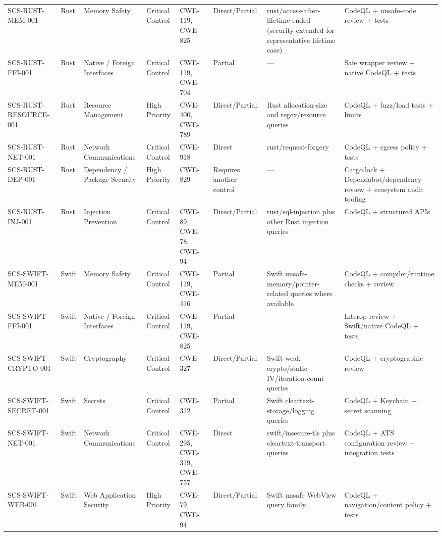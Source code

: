 \documentclass[10pt,letterpaper]{article}
\begin{document}
\begin{landscape}
\begin{longtable}{@{}P{1.0in}P{0.6in}P{0.95in}P{0.75in}P{0.85in}P{0.75in}P{2.0in}P{2.05in}@{}}
SCS-RUST-MEM-001 & Rust & Memory Safety & Critical Control & CWE-119, CWE-825 & Direct/Partial & rust/access-after-lifetime-ended (security-extended for representative lifetime case) & CodeQL + unsafe-code review + tests\\
SCS-RUST-FFI-001 & Rust & Native / Foreign Interfaces & Critical Control & CWE-119, CWE-704 & Partial & --- & Safe wrapper review + native CodeQL + tests\\
SCS-RUST-RESOURCE-001 & Rust & Resource Management & High Priority & CWE-400, CWE-789 & Direct/Partial & Rust allocation-size and regex/resource queries & CodeQL + fuzz/load tests + limits\\
SCS-RUST-NET-001 & Rust & Network Communications & Critical Control & CWE-918 & Direct & rust/request-forgery & CodeQL + egress policy + tests\\
SCS-RUST-DEP-001 & Rust & Dependency / Package Security & High Priority & CWE-829 & Requires another control & --- & Cargo.lock + Dependabot/dependency review + ecosystem audit tooling\\
SCS-RUST-INJ-001 & Rust & Injection Prevention & Critical Control & CWE-89, CWE-78, CWE-94 & Direct/Partial & rust/sql-injection plus other Rust injection queries & CodeQL + structured APIs\\
SCS-SWIFT-MEM-001 & Swift & Memory Safety & Critical Control & CWE-119, CWE-416 & Partial & Swift unsafe-memory/pointer-related queries where available & CodeQL + compiler/runtime checks + review\\
SCS-SWIFT-FFI-001 & Swift & Native / Foreign Interfaces & Critical Control & CWE-119, CWE-825 & Partial & --- & Interop review + Swift/native CodeQL + tests\\
SCS-SWIFT-CRYPTO-001 & Swift & Cryptography & Critical Control & CWE-327 & Direct/Partial & Swift weak-crypto/static-IV/iteration-count queries & CodeQL + cryptographic review\\
SCS-SWIFT-SECRET-001 & Swift & Secrets & Critical Control & CWE-312 & Partial & Swift cleartext-storage/logging queries & CodeQL + Keychain + secret scanning\\
SCS-SWIFT-NET-001 & Swift & Network Communications & Critical Control & CWE-295, CWE-319, CWE-757 & Direct & swift/insecure-tls plus cleartext-transport queries & CodeQL + ATS configuration review + integration tests\\
SCS-SWIFT-WEB-001 & Swift & Web Application Security & High Priority & CWE-79, CWE-94 & Direct/Partial & Swift unsafe WebView query family & CodeQL + navigation/content policy + tests\\

\end{longtable}
\end{landscape}
\end{document}
